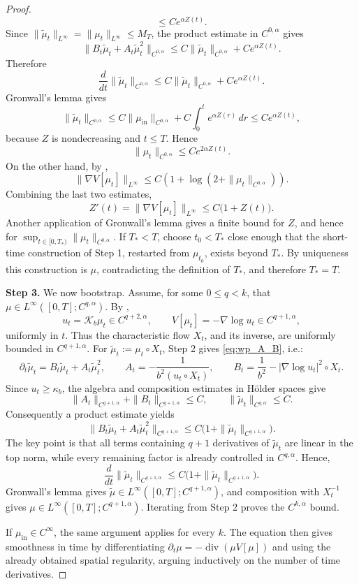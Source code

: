 \documentclass[10pt,a4paper]{amsart}
\newcommand{\divg}{\operatorname{div}}
\begin{document}
\begin{proof}
\[\le Ce^{\alpha Z(t)} .
\]
Since \(\|\tilde\mu_t\|_{L^\infty}=\|\mu_t\|_{L^\infty}\le M_T\), the product
estimate in \(C^{0,\alpha}\) gives
\[
\|B_t\tilde\mu_t+A_t\tilde\mu_t^2\|_{C^{0,\alpha}}
\le
C\|\tilde\mu_t\|_{C^{0,\alpha}}+Ce^{\alpha Z(t)} .
\]
Therefore
\[
\frac{d}{dt}\|\tilde\mu_t\|_{C^{0,\alpha}}
\le
C\|\tilde\mu_t\|_{C^{0,\alpha}}+Ce^{\alpha Z(t)} .
\]
Gronwall's lemma gives
\[
\|\tilde\mu_t\|_{C^{0,\alpha}}
\le
C\|\mu_{\mathrm{in}}\|_{C^{0,\alpha}}
+C\int_0^t e^{\alpha Z(r)}\,dr
\le Ce^{\alpha Z(t)},
\]
because \(Z\) is nondecreasing and \(t\le T\). Hence
\[
\|\mu_t\|_{C^{0,\alpha}}
\le Ce^{2\alpha Z(t)} .
\]
On the other hand, by ,
\[
\|\nabla V[\mu_t]\|_{L^\infty}
\le
C\left(1+\log(2+\|\mu_t\|_{C^{0,\alpha}})\right).
\]
Combining the last two estimates,
\[
Z'(t)=\|\nabla V[\mu_t]\|_{L^\infty}
\le C\bigl(1+Z(t)\bigr).
\]
Another application of Gronwall's lemma gives a finite bound for \(Z\), and
hence for \(\sup_{t\in[0,T_\ast)}\|\mu_t\|_{C^{0,\alpha}}\). If
\(T_\ast<T\), choose \(t_0<T_\ast\) close enough that the short-time
construction of Step 1, restarted from \(\mu_{t_0}\), exists beyond
\(T_\ast\). By uniqueness this construction is \(\mu\), contradicting the
definition of \(T_\ast\), and therefore \(T_\ast=T\).

\smallskip
\noindent\textbf{Step 3.}
We now bootstrap.  Assume, for some \(0\le q<k\), that
\(\mu\in L^\infty([0,T];C^{q,\alpha})\).  By
,
\[
u_t=\mathcal K_b\mu_t\in C^{q+2,\alpha},
\qquad
V[\mu_t]=-\nabla\log u_t\in C^{q+1,\alpha},
\]
uniformly in \(t\).  Thus the characteristic flow \(X_t\), and its inverse,
are uniformly bounded in \(C^{q+1,\alpha}\).  For
\(\tilde\mu_t:=\mu_t\circ X_t\), Step 2 gives \eqref{eq:wp_A_B}, i.e.:
\[
\partial_t\tilde\mu_t=B_t\tilde\mu_t+A_t\tilde\mu_t^2,
\qquad
A_t=-\frac1{b^2(u_t\circ X_t)},\qquad
B_t=\frac1{b^2}-|\nabla\log u_t|^2\circ X_t .
\]
Since \(u_t\ge\kappa_b\), the algebra and composition estimates in Hölder
spaces give
\[
\|A_t\|_{C^{q+1,\alpha}}+\|B_t\|_{C^{q+1,\alpha}}\le C,
\qquad
\|\tilde\mu_t\|_{C^{q,\alpha}}\le C .
\]
Consequently a product estimate yields
\[
\|B_t\tilde\mu_t+A_t\tilde\mu_t^2\|_{C^{q+1,\alpha}}
\le C\bigl(1+\|\tilde\mu_t\|_{C^{q+1,\alpha}}\bigr).
\]
The key point is that all terms containing \(q+1\) derivatives of
\(\tilde\mu_t\) are linear in the top norm, while every remaining factor is already
controlled in \(C^{q,\alpha}\).  Hence,
\[
\frac{d}{dt}\|\tilde\mu_t\|_{C^{q+1,\alpha}}
\le C\bigl(1+\|\tilde\mu_t\|_{C^{q+1,\alpha}}\bigr).
\]
Gronwall's lemma gives
\(\tilde\mu\in L^\infty([0,T];C^{q+1,\alpha})\), and composition with
\(X_t^{-1}\) gives
\(\mu\in L^\infty([0,T];C^{q+1,\alpha})\).  Iterating from Step 2 proves the
\(C^{k,\alpha}\) bound.

If \(\mu_{\mathrm{in}}\in C^\infty\), the same argument applies for every \(k\).  The
equation then gives smoothness in time by differentiating
\(\partial_t\mu=-\divg(\mu V[\mu])\) and using the already obtained spatial
regularity, arguing inductively on the number of time derivatives.
\end{proof}
\end{document}

